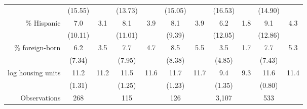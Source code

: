 \begin{tabular}{r*{5}{c}*{5}{c}}
                    &     (15.55)&            &     (13.73)&            &     (15.05)&            &     (16.53)&            &     (14.90)&            \\
\% Hispanic         &         7.0&         3.1&         8.1&         3.9&         8.1&         3.9&         6.2&         1.8&         9.1&         4.3\\
                    &     (10.11)&            &     (11.01)&            &      (9.39)&            &     (12.05)&            &     (12.86)&            \\
\% foreign-born     &         6.2&         3.5&         7.7&         4.7&         8.5&         5.5&         3.5&         1.7&         7.7&         5.3\\
                    &      (7.34)&            &      (7.95)&            &      (8.38)&            &      (4.85)&            &      (7.43)&            \\
log housing units   &        11.2&        11.2&        11.5&        11.6&        11.7&        11.7&         9.4&         9.3&        11.6&        11.4\\
                    &      (1.31)&            &      (1.25)&            &      (1.23)&            &      (1.35)&            &      (0.80)&            \\
\midrule
Observations        &         268&            &         115&            &         126&            &       3,107&            &         533&            \\
\bottomrule \end{tabular}
